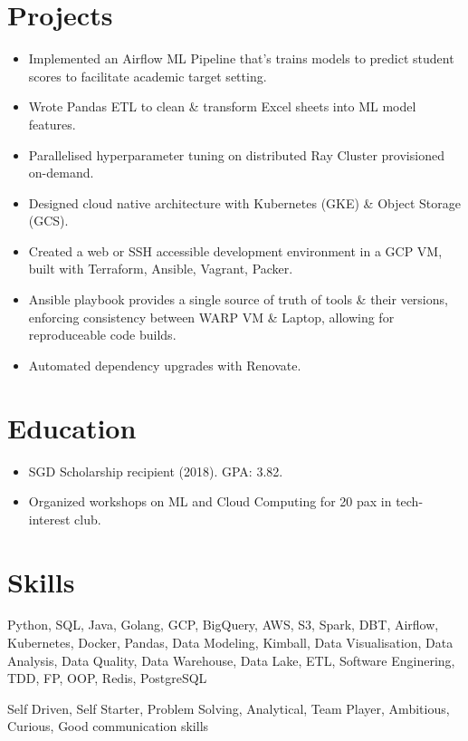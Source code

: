\section{Projects}
\begin{itemize}
  \item Implemented an Airflow ML Pipeline that's trains models to predict student scores
    to facilitate academic target setting.
  \item Wrote Pandas ETL to clean \& transform Excel sheets into ML model features.
  \item Parallelised hyperparameter tuning on distributed Ray Cluster provisioned on-demand.
  \item Designed cloud native architecture with Kubernetes (GKE) \& Object Storage (GCS).
\end{itemize}

\begin{itemize}
  \item Created a web or SSH accessible development environment in a GCP VM,
    built with Terraform, Ansible, Vagrant, Packer.
  \item Ansible playbook provides a single source of truth of tools \& their versions,
    enforcing consistency between WARP VM \& Laptop, allowing for reproduceable code builds.
  \item Automated dependency upgrades with Renovate.
\end{itemize}
  
\section{Education}
\begin{itemize}
  \item SGD Scholarship recipient (2018). GPA: 3.82.
  \item Organized workshops on ML and Cloud Computing for 20 pax in tech-interest club.
\end{itemize}

\section{Skills}
\begin{description}
  \footnotesize{
  \item[Technical] Python, SQL, Java, Golang, GCP, BigQuery, AWS, S3, Spark, DBT, Airflow, Kubernetes, Docker, Pandas, Data Modeling, Kimball, Data Visualisation, Data Analysis, Data Quality, Data Warehouse, Data Lake, ETL, Software Enginering, TDD, FP, OOP, Redis, PostgreSQL
  \item[People]
    Self Driven, Self Starter, Problem Solving, Analytical, Team Player, Ambitious, Curious, Good communication skills
  }
\end{description}
